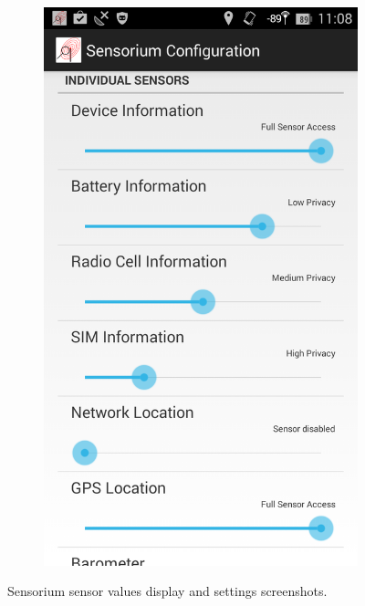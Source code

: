 \begin{figure}[htb]
\begin{subfigure}[b]{0.45\textwidth}
        \end{subfigure}%
        \hfill
        \begin{subfigure}[b]{0.45\textwidth}
			\centering
			\includegraphics[width=\textwidth]{images/sensorium-settings.png}
		   \end{subfigure}%
	\caption{Sensorium sensor values display and settings screenshots.}
\label{c5:fig:sensorium}
\end{figure}

